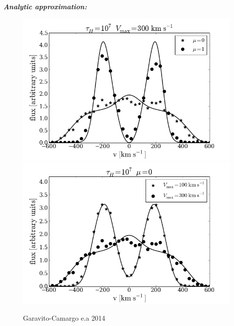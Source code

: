 \documentclass{beamer}
\begin{document}
\begin{frame}{\textit{\textbf{Analytic approximation:}}}
\begin{figure}
\includegraphics[scale=0.2]{Figures/vary_angle1.png}
\includegraphics[scale=0.2]{Figures/vary_vel1.png}
\caption*{Garavito-Camargo e.a 2014}
\end{figure}
\end{frame}
\end{document}
